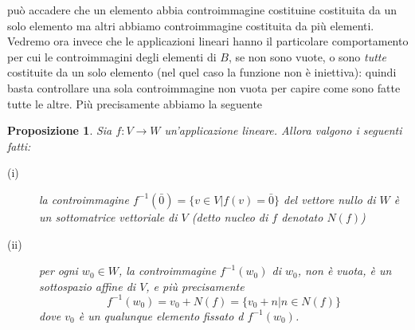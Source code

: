 \documentclass{book}
\newtheorem{proposizione}{Proposizione}
\begin{document}
può accadere che un elemento abbia controimmagine costituine costituita da un solo elemento ma altri abbiamo
controimmagine costituita da più elementi. Vedremo ora invece che le applicazioni lineari hanno il particolare
comportamento per cui le controimmagini degli elementi di $B$, se non sono vuote, o sono \textit{tutte}
costituite da un solo elemento (nel quel caso la funzione non è iniettiva): quindi basta controllare una sola
controimmagine non vuota per capire come sono fatte tutte le altre. Più precisamente abbiamo la seguente
\begin{proposizione}
  Sia $f: V\to W$ un'applicazione lineare. Allora valgono i seguenti fatti:
  \begin{description}
  \item[(i)] la controimmagine $f^{-1}(\bar{0})=\{v\in V | f(v)=\bar{0}\}$ del vettore nullo di $W$ è un
    sottomatrice vettoriale di $V$ (detto \textit{nucleo di} $f$ denotato $N(f)$)
  \item[(ii)] per ogni $w_0\in W$, la controimmagine $f^{-1}(w_0)$ di $w_0$,  non è vuota, è un sottospazio
    affine di $V$, e più precisamente
    \begin{equation*}
      f^{-1}(w_0)=v_0+N(f)=\{v_0+n|n\in N(f)\}
    \end{equation*}
    dove $v_0$ è un qualunque elemento fissato d $f^{-1}(w_0)$.
  \end{description}
\end{proposizione}
\end{document}

